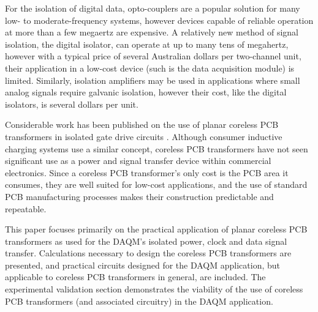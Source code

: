 \documentclass[conference]{IEEEtran}
\begin{document}
For the isolation of digital data, opto-couplers are a popular solution for many low- to moderate-frequency systems, however devices capable of reliable operation at more than a few megaertz are expensive.  A relatively new method of signal isolation, the digital isolator, can operate at up to many tens of megahertz, however with a typical price of several Australian dollars per two-channel unit, their application in a low-cost device (such is the data acquisition module) is limited.  Similarly, isolation amplifiers may be used in applications where small analog signals require galvanic isolation, however their cost, like the digital isolators, is several dollars per unit.

Considerable work has been published on the use of planar coreless PCB transformers in isolated gate drive circuits \cite{TangHuiFundamental,NaturallySoft,OptimalOperation,CorelessGateDrive}.  Although consumer inductive charging systems use a similar concept, coreless PCB transformers have not seen significant use as a power and signal transfer device within commercial electronics.  Since a coreless PCB transformer's only cost is the PCB area it consumes, they are well suited for low-cost applications, and the use of standard PCB manufacturing processes makes their construction predictable and repeatable.

This paper focuses primarily on the practical application of planar coreless PCB transformers as used for the DAQM's isolated power, clock and data signal transfer.  Calculations necessary to design the coreless PCB transformers are presented, and practical circuits designed for the DAQM application, but applicable to coreless PCB transformers in general, are included.  The experimental validation section demonstrates the viability of the use of coreless PCB transformers (and associated circuitry) in the DAQM application.
\end{document}
